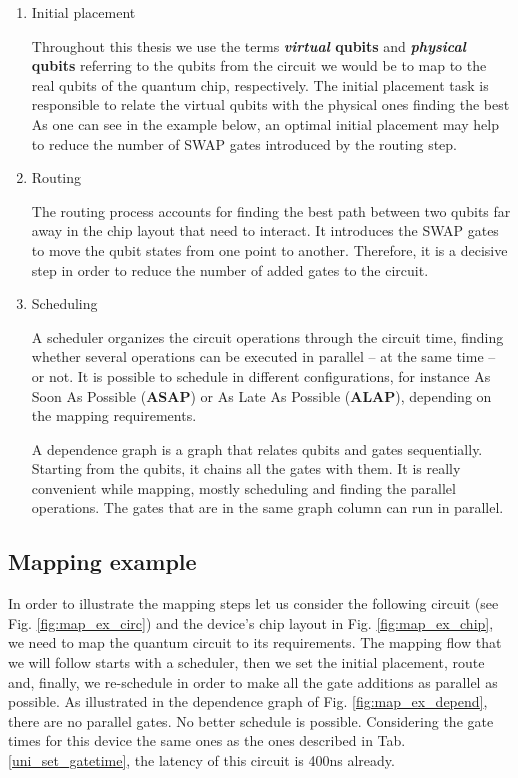 \begin{enumerate}
\item Initial placement
\label{sec:org88b7764}

Throughout this thesis we use the terms \textbf{\emph{virtual} qubits} and \textbf{\emph{physical} qubits} referring to the qubits from the circuit we would be to map to the real qubits of the quantum chip, respectively.
The initial placement task is responsible to relate the virtual qubits with the physical ones finding the best 
As one can see in the example below, an optimal initial placement may help to reduce the number of SWAP gates introduced by the routing step.

\item Routing
\label{sec:orgbc88062}

The routing process accounts for finding the best path between two qubits far away in the chip layout that need to interact.
It introduces the SWAP gates to move the qubit states from one point to another.
Therefore, it is a decisive step in order to reduce the number of added gates to the circuit.

\item Scheduling
\label{sec:org922ba8c}

A scheduler organizes the circuit operations through the circuit time,
finding whether several operations can be executed in parallel -- at the same time -- or not.
It is possible to schedule in different configurations, for instance As Soon As Possible (\textbf{ASAP}) or As Late As Possible (\textbf{ALAP}), depending on the mapping requirements.

A dependence graph is a graph that relates qubits and gates sequentially.
Starting from the qubits, it chains all the gates with them.
It is really convenient while mapping, mostly scheduling and finding the parallel operations.
The gates that are in the same graph column can run in parallel.
\end{enumerate}


\subsection{Mapping example}
\label{sec:org265b200}
In order to illustrate the mapping steps let us consider the following circuit (see Fig. \ref{fig:map_ex_circ}) and the device's chip layout in Fig. \ref{fig:map_ex_chip}, we need to map the quantum circuit to its requirements.
The mapping flow that we will follow starts with a scheduler, then we set the initial placement, route and, finally, we re-schedule in order to make all the gate additions as parallel as possible.
As illustrated in the dependence graph of Fig. \ref{fig:map_ex_depend}, there are no parallel gates.
No better schedule is possible.
Considering the gate times for this device the same ones as the ones described in Tab. \ref{uni_set_gatetime}, the latency of this circuit is 400ns already.


